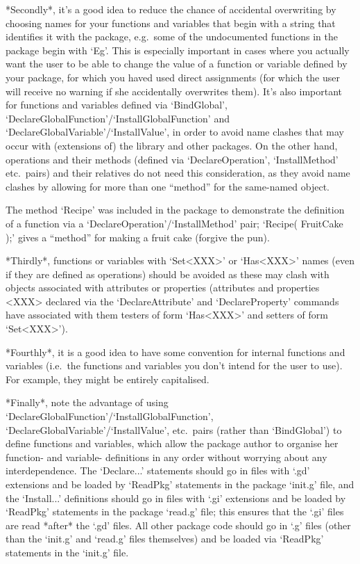 *Secondly*,  it's  a  good  idea  to  reduce  the  chance  of  accidental
overwriting by choosing names for your functions and variables that begin
with a string that identifies it  with  the  package,  e.g.~some  of  the
undocumented functions in the {\Example} package begin with `Eg'. This is
especially important in cases where you actually want the user to be able
to change the value of a function or variable defined  by  your  package,
for which you haved used direct assignments  (for  which  the  user  will
receive no warning  if  she  accidentally  overwrites  them).  It's  also
important  for  functions  and  variables   defined   via   `BindGlobal',
`DeclareGlobalFunction'/`InstallGlobalFunction'                       and
`DeclareGlobalVariable'/`InstallValue', in order to  avoid  name  clashes
that may  occur  with  (extensions  of)  the  {\GAP}  library  and  other
packages. On the other hand, operations and their  methods  (defined  via
`DeclareOperation', `InstallMethod' etc.~pairs) and  their  relatives  do
not need this consideration, as they avoid name clashes by  allowing  for
more than one ``method'' for the same-named object.

The method `Recipe' was included in the {\Example} package to demonstrate
the definition of a  function  via  a  `DeclareOperation'/`InstallMethod'
pair; `Recipe( FruitCake );' gives a ``method'' for making a  fruit  cake
(forgive the pun).

*Thirdly*, functions or variables with  `Set<XXX>'  or  `Has<XXX>'  names
(even if they are defined as operations) should be avoided as  these  may
clash with objects associated with attributes or  properties  (attributes
and  properties   <XXX>   declared   via   the   `DeclareAttribute'   and
`DeclareProperty' commands have associated  with  them  testers  of  form
`Has<XXX>' and setters of form `Set<XXX>').

*Fourthly*, it is a good  idea  to  have  some  convention  for  internal
functions and variables  (i.e.~the  functions  and  variables  you  don't
intend for the  user  to  use).  For  example,  they  might  be  entirely
capitalised.

*Finally*,        note        the        advantage        of        using
`DeclareGlobalFunction'/`InstallGlobalFunction',
`DeclareGlobalVariable'/`InstallValue',    etc.~pairs    (rather     than
`BindGlobal') to define functions and variables, which allow the  package
author to organise her function- and variable- definitions in  any  order
without worrying about any interdependence. The  `Declare...'  statements
should go in files with `.gd'  extensions  and  be  loaded  by  `ReadPkg'
statements in the package `init.g' file, and the `Install...' definitions
should go in files with `.gi'  extensions  and  be  loaded  by  `ReadPkg'
statements in the package `read.g' file;  this  ensures  that  the  `.gi'
files are read *after* the `.gd' files. All  other  package  code  should
go in `.g' files (other than the `init.g' and `read.g' files  themselves)
and be loaded via `ReadPkg' statements in the `init.g' file.


